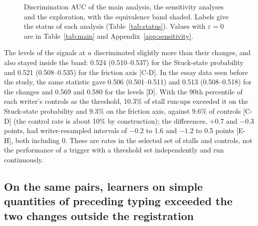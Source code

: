 \begin{figure}
  \caption{Discrimination AUC of the main analysis, the sensitivity analyses and the exploration, with the equivalence
  band shaded. Labels give the status of each analysis (Table~\ref{tab:status}). Values with $\varepsilon = 0$ are
  in Table~\ref{tab:main} and Appendix~\ref{app:sensitivity}.}
  \label{fig:forest}
\end{figure}

The levels of the signals at $u$ discriminated slightly more than their changes, and also stayed inside the band:
0.524 (0.510--0.537) for the Stuck-state probability and 0.521 (0.508--0.535) for the friction axis [C-D]. In the essay
data seen before the study, the same statistic gave 0.506 (0.501--0.511) and 0.513 (0.508--0.518) for the changes and
0.569 and 0.580 for the levels [D]. With the 90th percentile of each writer's controls as the threshold, 10.3\% of stall
run-ups exceeded it on the Stuck-state probability and 9.3\% on the friction axis, against 9.6\% of controls [C-D] (the control rate is about 10\% by construction); the differences, +0.7 and
$-0.3$ points, had writer-resampled intervals of $-0.2$ to 1.6 and $-1.2$ to 0.5 points [E-H], both including 0. These
are rates in the selected set of stalls and controls, not the performance of a trigger with a threshold set
independently and run continuously.

\subsection{On the same pairs, learners on simple quantities of preceding typing exceeded the two changes outside the registration}
\label{sec:res-learners}

